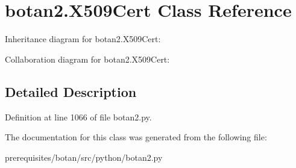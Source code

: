\hypertarget{classbotan2_1_1_x509_cert}{}\section{botan2.\+X509\+Cert Class Reference}
\label{classbotan2_1_1_x509_cert}


Inheritance diagram for botan2.\+X509\+Cert\+:


Collaboration diagram for botan2.\+X509\+Cert\+:


\subsection{Detailed Description}


Definition at line 1066 of file botan2.\+py.



The documentation for this class was generated from the following file\+:\begin{DoxyCompactItemize}
\item 
prerequisites/botan/src/python/botan2.\+py\end{DoxyCompactItemize}
